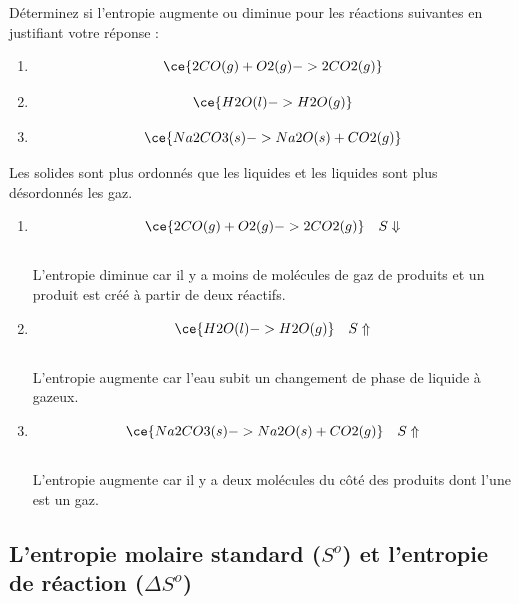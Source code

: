 \documentclass[
  11pt,
  a4paper,
  openany]{book}
\providecommand{\tightlist}{%
  \setlength{\itemsep}{0pt}\setlength{\parskip}{0pt}}
\begin{document}
\begin{Exercise}

Déterminez si l'entropie augmente ou diminue pour les réactions suivantes en justifiant votre réponse :

\begin{enumerate}
\def\labelenumi{\alph{enumi}.}
\tightlist
\item
  \[ \ce{2 CO(g) + O2(g) -> 2 CO2(g)} \]
\item
  \[ \ce{H2O(l) -> H2O(g)} \]
\item
  \[ \ce{Na2CO3(s) -> Na2O(s) +CO2(g)} \]
\end{enumerate}

\end{Exercise}

\begin{Answer}

Les solides sont plus ordonnés que les liquides et les liquides sont plus désordonnés les gaz.

\begin{enumerate}
\def\labelenumi{\alph{enumi}.}
\tightlist
\item
  \[ \ce{2 CO(g) + O2(g) -> 2 CO2(g)} \quad S \Downarrow \]\\
  L'entropie diminue car il y a moins de molécules de gaz de produits et un produit est créé à partir de deux réactifs.
\item
  \[ \ce{H2O(l) -> H2O(g)} \quad S \Uparrow \]\\
  L'entropie augmente car l'eau subit un changement de phase de liquide à gazeux.
\item
  \[ \ce{Na2CO3(s) -> Na2O(s) +CO2(g)} \quad S \Uparrow \]\\
  L'entropie augmente car il y a deux molécules du côté des produits dont l'une est un gaz.
\end{enumerate}

\end{Answer}

\subsection{\texorpdfstring{L'entropie molaire standard (\(S^o\)) et l'entropie de réaction (\(\Delta S^o\))}{L'entropie molaire standard (S\^{}o) et l'entropie de réaction (\textbackslash Delta S\^{}o)}}\label{lentropie-molaire-standard-so-et-lentropie-de-ruxe9action-delta-so}
\end{document}
